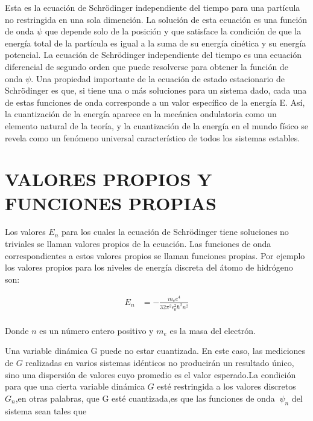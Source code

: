 \documentclass[a4paper]{article}
\begin{document}
        \indent Esta es la ecuación de Schrödinger independiente del tiempo para una partícula no restringida en una sola dimención. La solución de esta ecuación es una función de onda $\psi$ que depende solo de la posición y que satisface la condición de que la energía total de la partícula es igual a la suma de su energía cinética y su energía potencial. La ecuación de Schrödinger independiente del tiempo es una ecuación diferencial de segundo orden que puede resolverse para obtener la función de onda $\psi$.
        \indent Una propiedad importante de la ecuación de estado estacionario de Schrödinger es que, si tiene una o más soluciones para un sistema dado, cada una de estas funciones de onda corresponde a un valor específico de la energía E. Así, la cuantización de la energía aparece en la mecánica ondulatoria como un elemento natural de la teoría, y la cuantización de la energía en el mundo físico se revela como un fenómeno universal característico de todos los sistemas estables.

    \newpage
    \noindent
    \thispagestyle{fancy}
        
    \section{VALORES PROPIOS Y FUNCIONES PROPIAS}

    \indent Los valores $E_n$ para los cuales la ecuación de Schrödinger tiene soluciones no triviales se llaman valores propios de la ecuación. Las funciones de onda correspondientes a estos valores propios se llaman funciones propias. Por ejemplo los valores propios para los niveles de energía discreta del átomo de hidrógeno son:

    \begin{align*}
        E_n &= -\frac{m_e e^4}{32 \pi^2 \epsilon_0^2 \hbar^2 n^2} \\
    \end{align*}

    \indent Donde $n$ es un número entero positivo y $m_e$ es la masa del electrón. 

    \indent Una variable dinámica G puede no estar cuantizada. En este caso, las mediciones de $G$ realizadas en varios sistemas idénticos no producirán un resultado único, sino una dispersión de valores cuyo promedio es el valor esperado.La condición para que una cierta variable dinámica $G$ esté restringida a los valores discretos $G_n$,en otras palabras, que G esté cuantizada,es que las funciones de onda $\ \psi_n$ del sistema sean tales que
\end{document}
